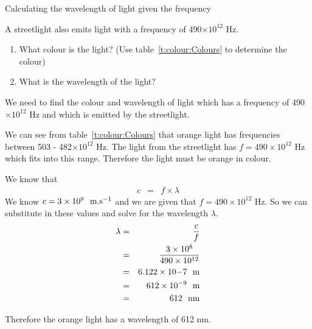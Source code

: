 \begin{wex}{Calculating the wavelength of light given the frequency}
{
\begin{minipage}{.8\textwidth}
A streetlight also emits light with a frequency of 490$ \times 10^{12}$ Hz.
\begin{enumerate}
\item What colour is the light? (Use table~\ref{t:colour:Colours} to determine the colour)
\item What is the wavelength of the light? 
\end{enumerate} 
\end{minipage}
}
{
We need to find the colour and wavelength of light which has a frequency of 490$ \times 10^{12}$ Hz and which is emitted by the streetlight.

We can see from table~\ref{t:colour:Colours} that orange light has frequencies between 503 - 482$\times 10^{12}$ Hz. The light from the streetlight has $f = 490\times 10^{12}$ Hz which fits into this range. Therefore the light must be orange in colour.

We know that 
\begin{eqnarray*}
c &=& f \times \lambda 
\end{eqnarray*}
We know $c = 3 \times 10^{8}~~\rm{m.s^{-1}}$ and we are given that $f = 490 \times 10^{12}$ Hz. So we can substitute in these values and solve for the wavelength $\lambda$.
\begin{eqnarray*}
\lambda &=& \frac{c}{f} \\
&=& \frac{3 \times 10^{8}}{490\times 10^{12}} \\
&=& 6.122 \times 10{-7}~~\rm{m} \\
&=& 612 \times 10^{-9}~~\rm{m} \\
&=& 612~~\rm{nm}
\end{eqnarray*}

Therefore the orange light has a wavelength of 612 nm.

}
\end{wex}


